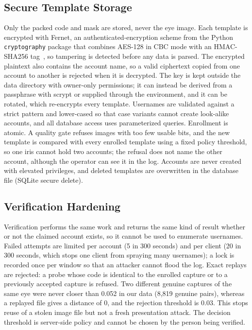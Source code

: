 \documentclass[conference]{IEEEtran}
\begin{document}
\subsection{Secure Template Storage}
Only the packed code and mask are stored, never the eye image. Each template is encrypted with Fernet, an authenticated-encryption scheme from the Python \texttt{cryptography} package that combines AES-128 in CBC mode with an HMAC-SHA256 tag~\cite{fernet}, so tampering is detected before any data is parsed. The encrypted plaintext also contains the account name, so a valid ciphertext copied from one account to another is rejected when it is decrypted. The key is kept outside the data directory with owner-only permissions; it can instead be derived from a passphrase with scrypt or supplied through the environment, and it can be rotated, which re-encrypts every template. Usernames are validated against a strict pattern and lower-cased so that case variants cannot create look-alike accounts, and all database access uses parameterized queries. Enrollment is atomic. A quality gate refuses images with too few usable bits, and the new template is compared with every enrolled template using a fixed policy threshold, so one iris cannot hold two accounts; the refusal does not name the other account, although the operator can see it in the log. Accounts are never created with elevated privileges, and deleted templates are overwritten in the database file (SQLite secure delete).

\subsection{Verification Hardening}
Verification performs the same work and returns the same kind of result whether or not the claimed account exists, so it cannot be used to enumerate usernames. Failed attempts are limited per account (5 in 300 seconds) and per client (20 in 300 seconds, which stops one client from spraying many usernames); a lock is recorded once per window so that an attacker cannot flood the log. Exact replays are rejected: a probe whose code is identical to the enrolled capture or to a previously accepted capture is refused. Two different genuine captures of the same eye were never closer than 0.052 in our data (8{,}819 genuine pairs), whereas a replayed file gives a distance of 0, and the rejection threshold is 0.03. This stops reuse of a stolen image file but not a fresh presentation attack. The decision threshold is server-side policy and cannot be chosen by the person being verified.
\end{document}
